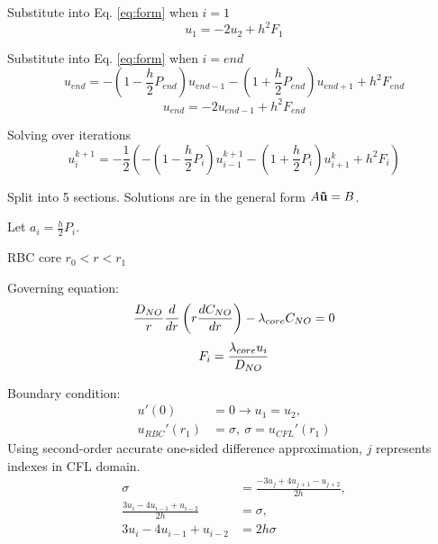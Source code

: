 \documentclass[8pt, a4paper]{article}
\begin{document}
  Substitute into Eq. \eqref{eq:form} when $i=1$
  \begin{equation}
  u_1=-2u_2+h^2F_1
  \end{equation}
  
  Substitute into Eq. \eqref{eq:form} when $i=end$
  \begin{equation}
  u_{end}=-\left (1-\frac{h}{2}P_{end} \right)u_{end-1}-\left 
  (1+\frac{h}{2}P_{end} \right)u_{end+1}+h^2F_{end}
  \end{equation}
  \begin{equation}
  u_{end}=-2u_{end-1}+h^2F_{end}
  \end{equation}
  
  Solving over iterations
  \begin{equation}
  u_i^{k+1} = -\frac{1}{2}\left(-\left (1-\frac{h}{2}P_i 
  \right)u_{i-1}^{k+1}-\left (1+\frac{h}{2}P_i \right)u_{i+1}^k+h^2F_i \right)
  \end{equation}

  Split into 5 sections. Solutions are in the general form $A\mathbf{\vec{u}}=B$.
  
  Let  $a_i=\frac{h}{2}P_i$.

  RBC core $r_0 < r < r_1$
  
  Governing equation:
  \begin{equation*}
  \frac{D_{NO}}{r}\frac{d}{dr}\left(r\frac{dC_{NO}}{dr}\right)-\lambda_{core}C_{NO}=0
  \end{equation*}
  \begin{equation*}
  F_i = \frac{\lambda_{core}u_i}{D_{NO}}
  \end{equation*}
  
  Boundary condition:
  \begin{align*}
  u'(0)&=0\rightarrow u_1 = u_2,\\
  u_{RBC}'(r_1)&=\sigma,\:\sigma=u_{CFL}'(r_1)
  \end{align*}
  Using second-order accurate one-sided difference approximation, $j$ 
  represents indexes in CFL domain.
  \begin{align*}
  \sigma&=\frac{-3u_j+4u_{j+1}-u_{j+2}}{2h},\\
  \frac{3u_i-4u_{i-1}+u_{i-2}}{2h}&=\sigma,\\
  3u_i-4u_{i-1}+u_{i-2}&=2h\sigma
  \end{align*}
  
\end{document}
